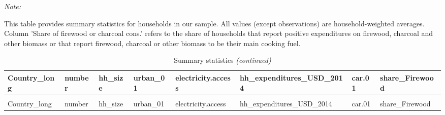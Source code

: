 \begingroup\fontsize{9}{11}\selectfont

\begin{ThreePartTable}
\begin{TableNotes}
\item \textit{Note: } 
\item This table provides summary statistics for households in our sample. All values (except observations) are household-weighted averages. Column 'Share of firewood or charcoal cons.' refers to the share of households that report positive expenditures on firewood, charcoal and other biomass or that report firewood, charcoal or other biomass to be their main cooking fuel.
\end{TableNotes}
\begin{longtable}[t]{>{\raggedright\arraybackslash}p{1.5 cm}|>{\raggedleft\arraybackslash}p{1.5 cm}>{\centering\arraybackslash}p{1.5 cm}>{\centering\arraybackslash}p{1.5 cm}>{\centering\arraybackslash}p{1.5 cm}>{\centering\arraybackslash}p{1.5 cm}>{\centering\arraybackslash}p{1.5 cm}>{\centering\arraybackslash}p{1.5 cm}}
\caption{\label{tab:A1}Summary statistics}\\
\toprule
Country\_long & number & hh\_size & urban\_01 & electricity.access & hh\_expenditures\_USD\_2014 & car.01 & share\_Firewood\\
\midrule
\endfirsthead
\caption[]{Summary statistics \textit{(continued)}}\\
\toprule
Country\_long & number & hh\_size & urban\_01 & electricity.access & hh\_expenditures\_USD\_2014 & car.01 & share\_Firewood\\
\midrule
\endhead


\end{longtable}
\end{ThreePartTable}
